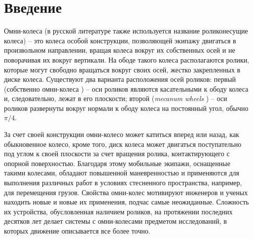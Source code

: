\section*{Введение}

Омни-колеса (в русской литературе также используется название роликонесущие колеса) -- это колеса особой конструкции, позволяющей экипажу двигаться в произвольном направлении, вращая колеса вокруг их собственных осей и не поворачивая их вокруг вертикали. На ободе такого колеса располагаются ролики, которые могут свободно вращаться вокруг своих осей, жестко закрепленных в диске колеса. Существуют два варианта расположения осей роликов: первый  (собственно омни-колеса \cite{formalskii}) -- оси роликов являются касательными к ободу колеса и, следовательно, лежат в его плоскости; второй (\textit{mecanum wheels} \cite{Gfrerrer2008}) -- оси роликов развернуты вокруг нормали к ободу колеса на постоянный угол, обычно $\pi/4$.

За счет своей конструкции омни-колесо может катиться вперед или назад, как обыкновенное колесо, кроме того, диск колеса может двигаться поступательно под углом к своей плоскости за счет вращения ролика, контактирующего с опорной поверхностью. Благодаря этому мобильные экипажи, оснащенные такими колесами, обладают повышенной маневренностью и применяются для выполнения различных работ в условиях стесненного пространства, например, для перемещения грузов.
Свойства омни-колес мотивируют инженеров и ученых находить новые и новые их применения, подчас самые неожиданные.
Сложность их устройства, обусловленная наличием роликов, на протяжении последних десятков лет делает системы с омни-колесами предметом исследований, в которых движение описывается все более точно.

